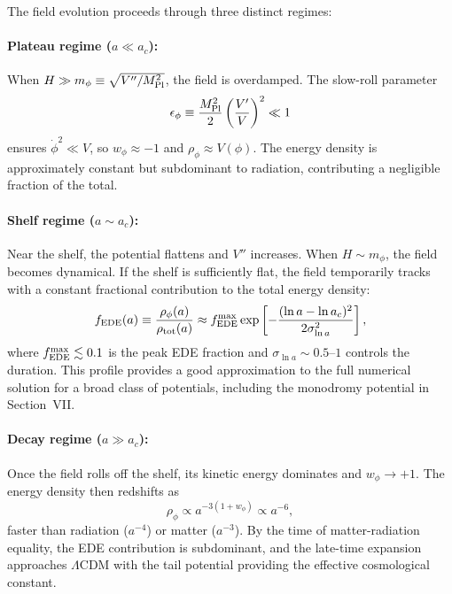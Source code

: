 \documentclass[a4paper,11pt]{article}
\begin{document}
The field evolution proceeds through three distinct regimes:

\paragraph{Plateau regime ($a \ll a_c$):} When $H \gg m_\phi \equiv \sqrt{V''/M_{\rm Pl}^2}$, the field is overdamped. The slow-roll parameter
\begin{equation}
\epsilon_\phi \equiv \frac{M_{\rm Pl}^2}{2}\left(\frac{V'}{V}\right)^2 \ll 1
\end{equation}
ensures $\dot{\phi}^2 \ll V$, so $w_\phi \approx -1$ and $\rho_\phi \approx V(\phi)$. The energy density is approximately constant but subdominant to radiation, contributing a negligible fraction of the total.

\paragraph{Shelf regime ($a \sim a_c$):} Near the shelf, the potential flattens and $V''$ increases. When $H \sim m_\phi$, the field becomes dynamical. If the shelf is sufficiently flat, the field temporarily tracks with a constant fractional contribution to the total energy density:
\begin{equation}
f_{\rm EDE}(a) \equiv \frac{\rho_\phi(a)}{\rho_{\rm tot}(a)} \approx f_{\rm EDE}^{\rm max} \exp\left[-\frac{(\ln a - \ln a_c)^2}{2\sigma_{\ln a}^2}\right],
\label{eq:fede}
\end{equation}
where $f_{\rm EDE}^{\rm max} \lesssim 0.1$ is the peak EDE fraction and $\sigma_{\ln a} \sim 0.5$--$1$ controls the duration. This profile provides a good approximation to the full numerical solution for a broad class of potentials, including the monodromy potential in Section~VII.

\paragraph{Decay regime ($a \gg a_c$):} Once the field rolls off the shelf, its kinetic energy dominates and $w_\phi \to +1$. The energy density then redshifts as
\begin{equation}
\rho_\phi \propto a^{-3(1+w_\phi)} \propto a^{-6},
\end{equation}
faster than radiation ($a^{-4}$) or matter ($a^{-3}$). By the time of matter-radiation equality, the EDE contribution is subdominant, and the late-time expansion approaches $\Lambda$CDM with the tail potential providing the effective cosmological constant.
\end{document}
